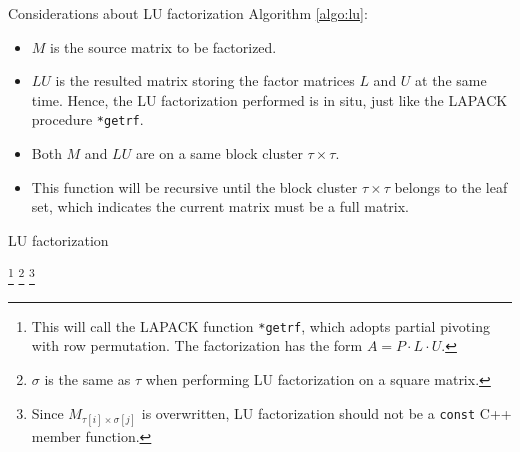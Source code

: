 \documentclass[11pt, a4paper]{book}
\begin{document}
Considerations about LU factorization Algorithm \ref{algo:lu}:
\begin{itemize}
\item $M$ is the source matrix to be factorized.
\item $LU$ is the resulted matrix storing the factor matrices $L$ and $U$ at the same time. Hence, the LU factorization performed is in situ, just like the LAPACK procedure \texttt{*getrf}.
\item Both $M$ and $LU$ are on a same block cluster $\tau\times\tau$.
\item This function will be recursive until the block cluster $\tau\times\tau$ belongs to the leaf set, which indicates the current matrix must be a full matrix.
\end{itemize}

\begin{breakablealgorithm}
  \label{algo:lu}
  \caption{LU factorization}
  \begin{algorithmic}[1]
         \footnote{This will call
the LAPACK function \texttt{*getrf}, which adopts partial pivoting with row permutation. The
factorization has the form $A = P \cdot L \cdot U$.}
      \Else
           \footnote{$\sigma$ is the
 same as $\tau$ when performing LU factorization on a square matrix.}
             \footnote{Since $M_{\tau[i]\times\sigma[j]}$ is overwritten, LU factorization should not
 be a \texttt{const} C++ member function.}
            \EndFor

            \EndIf
          \EndFor
        \EndFor
      \EndIf
    \EndProcedure
  \end{algorithmic}
\end{breakablealgorithm}
\end{document}
